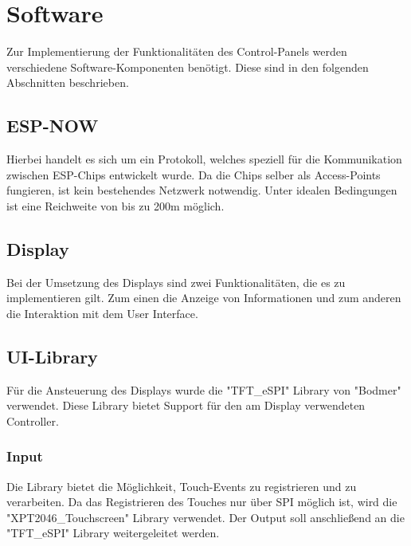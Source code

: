 \section{Software}
Zur Implementierung der Funktionalitäten des Control-Panels werden
verschiedene Software-Komponenten benötigt. Diese sind in den 
folgenden Abschnitten beschrieben.

    \subsection{ESP-NOW}
    Hierbei handelt es sich um ein Protokoll, welches
    speziell für die Kommunikation zwischen ESP-Chips
    entwickelt wurde. Da die Chips selber als Access-Points
    fungieren, ist kein bestehendes Netzwerk notwendig. Unter 
    idealen Bedingungen ist eine Reichweite von bis zu 200m 
    möglich.
    
    \subsection{Display} 
    Bei der Umsetzung des Displays sind zwei Funktionalitäten,
    die es zu implementieren gilt. Zum einen die Anzeige von
    Informationen und zum anderen die Interaktion mit dem
    User Interface. 
    \subsection{UI-Library}
    Für die Ansteuerung des Displays wurde die "TFT\_eSPI"
    \space Library von "Bodmer" verwendet. Diese Library bietet
    Support für den am Display verwendeten Controller.
    
        \subsubsection{Input}
        Die Library bietet die Möglichkeit, Touch-Events zu
        registrieren und zu verarbeiten. Da das Registrieren
        des Touches nur über SPI möglich ist, wird die
        "XPT2046\_Touchscreen" Library verwendet. Der Output
        soll anschließend an die "TFT\_eSPI" Library weitergeleitet
        werden.
